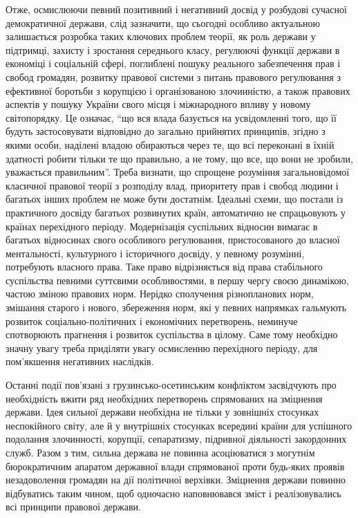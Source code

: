 Отже, осмислюючи певний позитивний і негативний досвід у розбудові сучасної демократичної держави, слід зазначити, що сьогодні особливо актуальною залишається розробка таких ключових проблем теорії, як роль держави у підтримці, захисту і зростання середнього класу, регулюючі функції держави в економіці і соціальній сфері, поглиблені пошуку реального забезпечення прав і свобод громадян, розвитку правової системи з питань правового регулювання з ефективної боротьби з корупцією і організованою злочинністю, а також правових аспектів у пошуку України свого місця і міжнародного впливу у новому світопорядку. Це означає, “що вся влада базується на усвідомленні того, що її будуть застосовувати відповідно до загально прийнятих принципів, згідно з якими особи, наділені владою обираються через те, що всі переконані в їхній здатності робити тільки те що правильно, а не тому, що все, що вони не зробили, уважається правильним”. Треба визнати, що спрощене розуміння загальновідомої класичної правової теорії з розподілу влад, приоритету прав і свобод людини і багатьох інших проблем не може бути достатнім. Ідеальні схеми, що постали із практичного досвіду багатьох розвинутих країн, автоматично не спрацьовують у країнах перехідного періоду. Модернізація суспільних відносин вимагає в багатьох відносинах свого особливого регулювання, пристосованого до власної ментальності, культурного і історичного досвіду, у певному розумінні, потребують власного права. Таке право відрізняється  від права стабільного суспільства певними суттєвими особливостями, в першу чергу своєю динамікою, частою зміною правових норм. Нерідко сполучення різнопланових норм, змішання старого і нового, збереження норм, які у певних напрямках гальмують розвиток соціально-політичних і економічних перетворень, неминуче спотворюють прагнення і розвиток суспільства в цілому. Саме тому необхідно значну увагу треба приділяти увагу осмисленню перехідного періоду, для пом’якшення негативних наслідків.

Останні події пов’язані з грузинсько-осетинським конфліктом засвідчують про необхідність вжити ряд необхідних перетворень спрямованих на зміцнення держави. Ідея сильної держави необхідна не тільки у зовнішніх стосунках неспокійного світу, але й у внутрішніх стосунках всередині країни для успішного подолання злочинності, корупції, сепаратизму, підривної діяльності закордонних служб. Разом з тим, сильна держава не повинна асоціюватися з могутнім бюрократичним апаратом державної влади спрямованої проти будь-яких проявів незадоволення громадян на дії політичної верхівки. Зміцнення держави повинно відбуватись таким чином, щоб одночасно наповнювався зміст і реалізовувались всі принципи правової держави.
